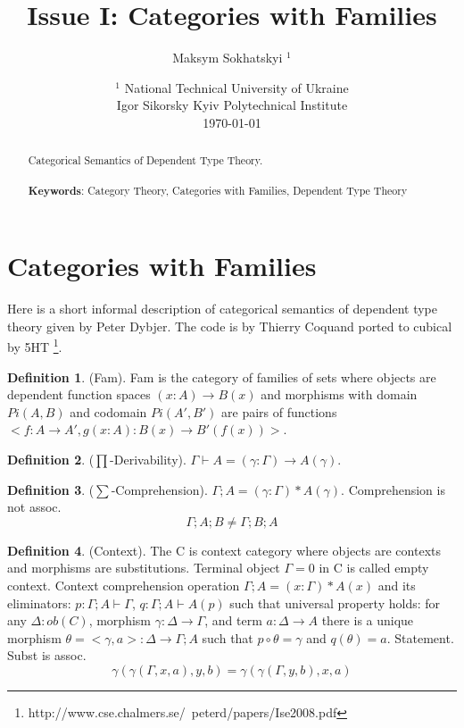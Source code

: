 \documentclass{article}
\theoremstyle{definition}
\newtheorem{definition}{Definition}
\begin{document}
 \title{Issue I: Categories with Families}
\author{Maksym Sokhatskyi $^1$}
\date{ $^1$ National Technical University of Ukraine \\
       \small Igor Sikorsky Kyiv Polytechnical Institute \\
       \today }

\maketitle

\begin{abstract}

Categorical Semantics of Dependent Type Theory.
\\
\\
{\bf Keywords}: Category Theory, Categories with Families, Dependent Type Theory
\end{abstract}
\tableofcontents

\newpage
\section{Categories with Families}

Here is a short informal description of
categorical semantics of dependent type theory given by Peter Dybjer.
The code is by Thierry Coquand ported to cubical by 5HT
\footnote{http://www.cse.chalmers.se/~peterd/papers/Ise2008.pdf}.

\begin{definition} (Fam). Fam is the category of families
of sets where objects are dependent function
spaces $(x:A)\rightarrow B(x)$ and morphisms with domain
$Pi(A,B)$ and codomain $Pi(A',B')$ are pairs of
functions $<f:A\rightarrow A',g(x:A):B(x)\rightarrow B'(f(x))>$.
\end{definition}

\begin{definition} ($\prod$-Derivability).
$\Gamma\vdash A = (\gamma:\Gamma)\rightarrow A(\gamma)$.
\end{definition}

\begin{definition} ($\sum$-Comprehension).
$\Gamma;A = (\gamma:\Gamma)*A(\gamma)$. Comprehension is not assoc.
$$
    \Gamma;A;B \neq \Gamma;B;A
$$
\end{definition}

\begin{definition} (Context).
The C is context category where objects are contexts and morphisms are substitutions.
Terminal object $\Gamma=0$ in C is called empty context.
Context comprehension operation $\Gamma;A = (x:\Gamma)*A(x)$ and
its eliminators: $p:\Gamma;A\vdash\Gamma$, $q:\Gamma;A\vdash A(p)$ such that
universal property holds: for any $\Delta:ob(C)$, morphism $\gamma:\Delta\rightarrow\Gamma$,
and term $a:\Delta\rightarrow A$ there is a unique morphism $\theta=<\gamma,a>:\Delta\rightarrow\Gamma;A$
such that $p\circ\theta=\gamma$ and $q(\theta)=a$. Statement. Subst is assoc.
$$
    \gamma(\gamma(\Gamma,x,a),y,b) = \gamma(\gamma(\Gamma,y,b),x,a)
$$
\end{definition}
\end{document}
